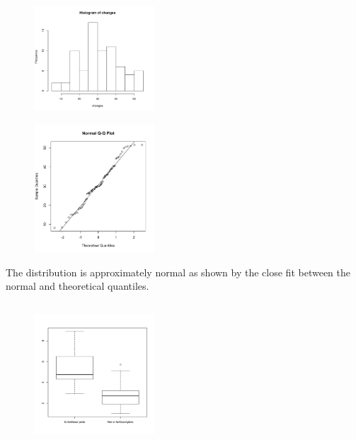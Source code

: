\documentclass[twocolumn]{article}
\begin{document}
\subsection{}
\begin{figure}[h]
\centering
\includegraphics[width=0.4\textwidth]{6b1.pdf}
\end{figure}
\newpage
\begin{figure}[h]
\centering
\includegraphics[width=0.4\textwidth]{6b2.pdf}
\end{figure}

The distribution is approximately normal as shown by the close fit between the normal and theoretical quantiles.

\subsection{}
\begin{figure}[h]
\centering
\includegraphics[width=0.4\textwidth]{6c.pdf}
\end{figure}
\end{document}
